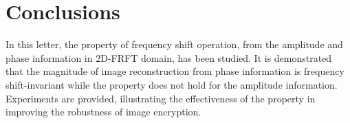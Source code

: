 \documentclass[journal]{IEEEtran}
\begin{document}
\section{Conclusions}
In this letter, the property of frequency shift operation, from the amplitude and phase information in 2D-FRFT domain, has been studied. It is demonstrated that the magnitude of image reconstruction from phase information is frequency shift-invariant while the property does not hold for the amplitude information. Experiments are provided, illustrating the effectiveness of the property in improving the robustness of image encryption.







\ifCLASSOPTIONcaptionsoff
  \newpage
\fi




\end{document}
